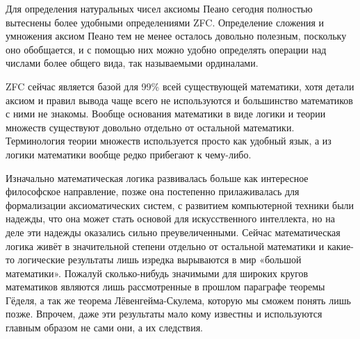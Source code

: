 Для определения натуральных чисел аксиомы Пеано сегодня полностью вытеснены более удобными определениями ZFC. Определение сложения и умножения аксиом Пеано тем не менее осталось довольно полезным, поскольку оно обобщается, и с помощью них  можно удобно определять операции над числами более общего вида, так называемыми ординалами.

ZFC сейчас является базой для 99\% всей существующей математики, хотя детали аксиом и правил вывода чаще всего не используются и большинство математиков с ними не знакомы. Вообще основания математики в виде логики и теории множеств существуют довольно отдельно от остальной математики. Терминология теории множеств используется просто как удобный язык, а из логики математики вообще редко прибегают к чему-либо.

Изначально математическая логика развивалась больше как интересное философское направление, позже она постепенно прилаживалась для формализации аксиоматических систем, с развитием компьютерной техники были надежды, что она может стать основой для искусственного интеллекта, но на деле эти надежды оказались сильно преувеличенными. Сейчас математическая логика живёт в значительной степени отдельно от остальной математики и какие-то логические результаты лишь изредка вырываются в мир «большой математики». Пожалуй сколько-нибудь значимыми для широких кругов математиков являются лишь рассмотренные в прошлом параграфе теоремы Гёделя, а так же теорема Лёвенгейма-Скулема, которую мы сможем понять лишь позже. Впрочем, даже эти результаты мало кому известны и используются главным образом не сами они, а их следствия.
